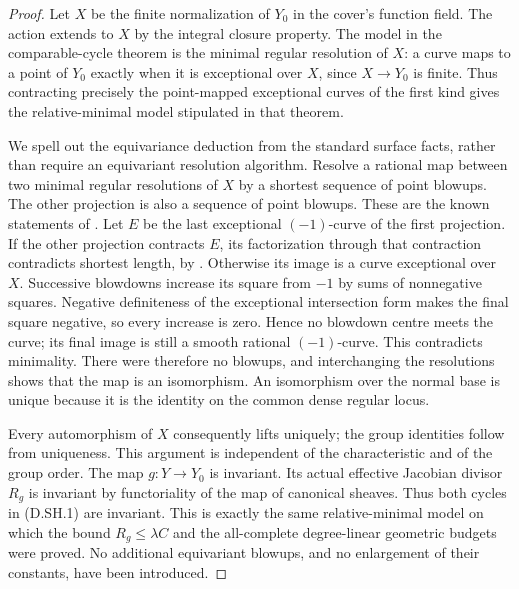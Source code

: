 \begin{proof}
Let $X$ be the finite normalization of $Y_0$ in the cover's
function field. The action extends to $X$ by the integral
closure property. The model in the comparable-cycle theorem
is the minimal regular resolution of $X$: a curve maps to a
point of $Y_0$ exactly when it is exceptional over $X$, since
$X\to Y_0$ is finite. Thus contracting precisely the
point-mapped exceptional curves of the first kind gives
the relative-minimal model stipulated in that theorem.

We spell out the equivariance deduction from the standard
surface facts, rather than require an equivariant resolution
algorithm. Resolve a rational map between two minimal regular
resolutions of $X$ by a shortest sequence of point blowups.
The other projection is also a sequence of point blowups.
These are the known statements of
\citet[Lemmas 54.4.3 and 54.17.1, Tags 0C5H and 0C5R]
{StacksSkewMinimalModelD}. Let $E$ be the last exceptional
$(-1)$-curve of the first projection. If the other projection
contracts $E$, its factorization through that contraction
contradicts shortest length, by
\citet[Lemma 54.16.1, Tag 0C5J]{StacksSkewMinimalModelD}.
Otherwise its image is a curve exceptional over $X$.
Successive blowdowns increase its square from $-1$ by sums
of nonnegative squares. Negative definiteness of the
exceptional intersection form makes the final square
negative, so every increase is zero. Hence no blowdown
centre meets the curve; its final image is still a smooth
rational $(-1)$-curve. This contradicts minimality.
There were therefore no blowups, and interchanging the
resolutions shows that the map is an isomorphism.
An isomorphism over the normal base is unique because it is
the identity on the common dense regular locus.

Every automorphism of $X$ consequently lifts uniquely; the
group identities follow from uniqueness. This argument is
independent of the characteristic and of the group order.
The map $g:Y\to Y_0$ is invariant. Its actual effective
Jacobian divisor $R_g$ is invariant by functoriality of the
map of canonical sheaves. Thus both cycles in (D.SH.1) are
invariant. This is exactly the same relative-minimal model
on which the bound $R_g\le\lambda C$ and the all-complete
degree-linear geometric budgets were proved. No additional
equivariant blowups, and no enlargement of their constants,
have been introduced.
\end{proof}

